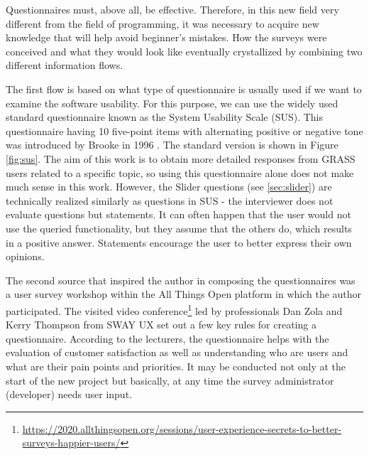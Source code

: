 \documentclass[a4paper,10pt,twoside]{article}
\begin{document}
Questionnaires must, above all, be effective. Therefore, in this new
field very different from the field of programming, it was necessary
to acquire new knowledge that will help avoid beginner's mistakes. How
the surveys were conceived and what they would look like eventually
crystallized by combining two different information flows.

The first flow is based on what type of questionnaire is usually used
if we want to examine the software usability. For this purpose, we can
use the widely used standard questionnaire known as the System
Usability Scale (SUS). This questionnaire having 10 five-point items
with alternating positive or negative tone was introduced by Brooke in
1996 \cite{sus}. The standard version is shown in Figure
\ref{fig:sus}. The aim of this work is to obtain more detailed
responses from GRASS users related to a specific topic, so using this
questionnaire alone does not make much sense in this work. However,
the Slider questions (see \ref{sec:slider}) are technically realized
similarly as questions in SUS - the interviewer does not evaluate
questions but statements. It can often happen that the user would not
use the queried functionality, but they assume that the others do,
which results in a positive answer. Statements encourage the user to
better express their own opinions.

The second source that inspired the author in composing the
questionnaires was a user survey workshop within the All Things Open
platform in which the author participated. The visited video
conference\footnote{\url{https://2020.allthingsopen.org/sessions/user-experience-secrets-to-better-surveys-happier-users/}}
led by professionals Dan Zola and Kerry Thompson from SWAY UX set out
a few key rules for creating a questionnaire. According to the
lecturers, the questionnaire helps with the evaluation of customer
satisfaction as well as understanding who are users and what are their
pain points and priorities. It may be conducted not only at the start
of the new project but basically, at any time the survey administrator
(developer) needs user input.
\end{document}
